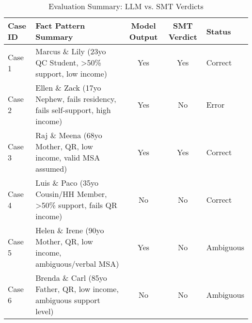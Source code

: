 \documentclass[11pt, letterpaper]{article}
\begin{document}
\begin{table}[htbp] %
 \centering
 \caption{Evaluation Summary: LLM vs. SMT Verdicts}
 \label{tab:summary}
 \begin{tabularx}{\textwidth}{@{} l >{\RaggedRight}X c c l @{}}
  \toprule
  \textbf{Case ID} & \textbf{Fact Pattern Summary}                 & \textbf{Model Output} & \textbf{SMT Verdict} & \textbf{Status} \\
  \midrule
  Case 1  & Marcus \& Lily (23yo QC Student, >50\% support, low income)           & Yes          & Yes         & Correct \\ \addlinespace %
  Case 2  & Ellen \& Zack (17yo Nephew, fails residency, fails self-support, high income)            & Yes          & No          & Error   \\ \addlinespace
  Case 3  & Raj \& Meena (68yo Mother, QR, low income, valid MSA assumed)                 & Yes          & Yes         & Correct \\ \addlinespace
  Case 4  & Luis \& Paco (35yo Cousin/HH Member, >50\% support, fails QR income)         & No           & No          & Correct \\ \addlinespace
  Case 5  & Helen \& Irene (90yo Mother, QR, low income, ambiguous/verbal MSA)        & Yes          & No          & Ambiguous   \\ \addlinespace
  Case 6  & Brenda \& Carl (85yo Father, QR, low income, ambiguous support level) & No           & No          & Ambiguous \\
  \bottomrule
 \end{tabularx}
\end{table}
\end{document}
